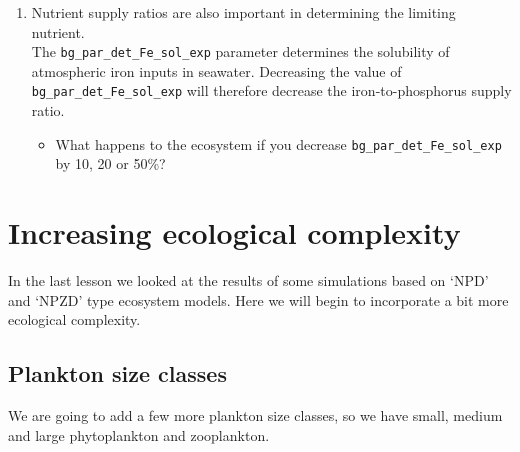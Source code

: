 \documentclass[11pt,fleqn]{book} %
\begin{document}
\begin{enumerate}[noitemsep]
\item Nutrient supply ratios are also important in determining the limiting nutrient.
\\The \texttt{bg\_par\_det\_Fe\_sol\_exp} parameter determines the solubility of atmospheric iron inputs in seawater. Decreasing the value of \texttt{bg\_par\_det\_Fe\_sol\_exp} will therefore decrease the iron-to-phosphorus supply ratio.
\begin{itemize}
\item What happens to the ecosystem if you decrease \texttt{bg\_par\_det\_Fe\_sol\_exp} by 10, 20 or 50\%?
\end{itemize}

\end{enumerate}
\vspace{2mm}


\newpage


\section{Increasing ecological complexity}

In the last lesson we looked at the results of some simulations based on `NPD' and `NPZD' type ecosystem models. Here we will begin to incorporate a bit more ecological complexity.  


\subsection{Plankton size classes} We are going to add a few more plankton size classes, so we have small, medium and large phytoplankton and zooplankton.
\end{document}
